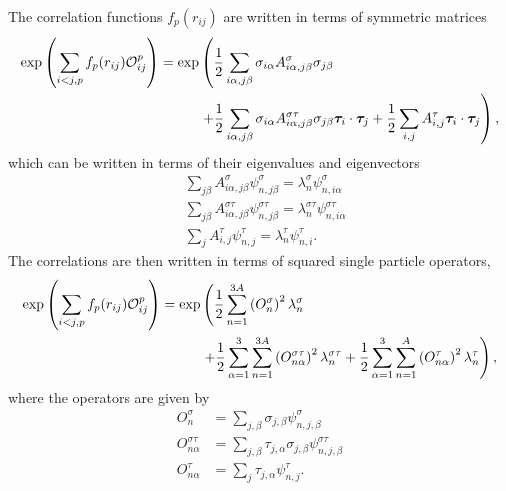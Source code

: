 The correlation functions $f_p(r_{ij})$ are written in terms of symmetric matrices
\begin{equation}
\begin{split}
   \exp\left(\sum\limits_{i<j,p}f_p(r_{ij})\mathcal{O}^p_{ij}\right) = \exp&\left(\frac{1}{2}\sum\limits_{i\alpha,j\beta} \sigma_{i\alpha}A^{\sigma}_{i\alpha,j\beta}\sigma_{j\beta}\right. \\
      &\left. + \frac{1}{2}\sum\limits_{i\alpha,j\beta} \sigma_{i\alpha}A^{\sigma\tau}_{i\alpha,j\beta}\sigma_{j\beta}\bm{\tau}_i\cdot\bm{\tau}_j
      + \frac{1}{2}\sum\limits_{i,j} A^{\tau}_{i,j}\bm{\tau}_i\cdot\bm{\tau}_j\right),
\end{split}
\end{equation}
which can be written in terms of their eigenvalues and eigenvectors
\begin{align}
   &\sum\limits_{j\beta} A^{\sigma}_{i\alpha,j\beta}\psi^{\sigma}_{n,j\beta} = \lambda^{\sigma}_n\psi^{\sigma}_{n,i\alpha} \\
   &\sum\limits_{j\beta} A^{\sigma\tau}_{i\alpha,j\beta}\psi^{\sigma\tau}_{n,j\beta} = \lambda^{\sigma\tau}_n\psi^{\sigma\tau}_{n,i\alpha} \\
   &\sum\limits_{j} A^{\tau}_{i,j}\psi^{\tau}_{n,j} = \lambda^{\tau}_n\psi^{\tau}_{n,i}.
\end{align}
The correlations are then written in terms of squared single particle operators,
\begin{equation}
\begin{split}
   \exp\left(\sum\limits_{i<j,p}f_p(r_{ij})\mathcal{O}^p_{ij}\right) = \exp&\left(\frac{1}{2}\sum\limits_{n=1}^{3A} \left(O_{n}^{\sigma}\right)^2 \lambda_n^{\sigma}\right. \\
      & \left. + \frac{1}{2}\sum\limits_{\alpha=1}^{3}\sum\limits_{n=1}^{3A} \left(O_{n\alpha}^{\sigma\tau}\right)^2 \lambda_n^{\sigma\tau}
      + \frac{1}{2}\sum\limits_{\alpha=1}^{3}\sum\limits_{n=1}^{A} \left(O_{n\alpha}^{\tau}\right)^2 \lambda_n^{\tau}\right),
\end{split}
\end{equation}
where the operators are given by
\begin{equation}
\begin{split}
   O_{n}^{\sigma} &= \sum\limits_{j,\beta} \sigma_{j,\beta}\psi_{n,j,\beta}^{\sigma} \\
   O_{n\alpha}^{\sigma\tau} &= \sum\limits_{j,\beta} \tau_{j,\alpha}\sigma_{j,\beta}\psi_{n,j,\beta}^{\sigma\tau} \\
   O_{n\alpha}^{\tau} &= \sum\limits_{j} \tau_{j,\alpha}\psi_{n,j}^{\tau}.
\end{split}
\end{equation}
